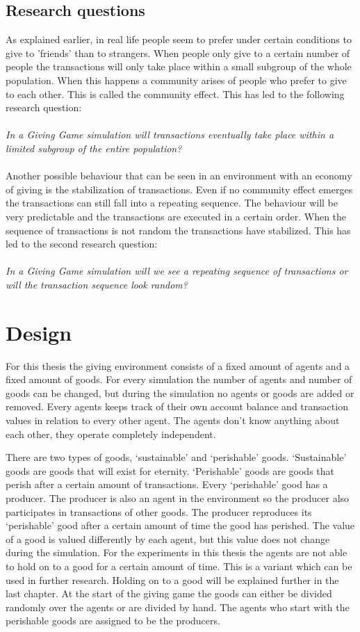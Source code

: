 \documentclass[twoside,openright]{uva-bachelor-thesis}
\begin{document}
\section{Research questions}
As explained earlier, in real life people seem to prefer under certain conditions to give to 'friends' than to strangers. When people only give to a certain number of people the transactions will only take place within a small subgroup of the whole population. When this happens a community arises of people who prefer to give to each other. This is called the community effect. This has led to the following research question:
\\
\\
\textit{In a Giving Game simulation will transactions eventually take place within a limited subgroup of the entire population?}
\\
\\
Another possible behaviour that can be seen in an environment with an economy of giving is the stabilization of transactions. Even if no community effect emerges the transactions can still fall into a repeating sequence. The behaviour will be very predictable and the transactions are executed in a certain order. When the sequence of transactions is not random the transactions have stabilized. This has led to the second research question:
\\
\\
\textit{In a Giving Game simulation will we see a repeating sequence of transactions or will the transaction sequence look random?}


\chapter{Design}
For this thesis the giving environment consists of a fixed amount of agents and a fixed amount of goods. For every simulation the number of agents and number of goods can be changed, but during the simulation no agents or goods are added or removed.  Every agents keeps track of their own account balance and transaction values in relation to every other agent. The agents don’t know anything about each other, they operate completely independent.

There are two types of goods, ‘sustainable’ and ‘perishable’ goods. ‘Sustainable’ goods are goods that will exist for eternity. ‘Perishable’ goods are goods that perish after a certain amount of transactions. Every ‘perishable’ good has a producer. The producer is also an agent in the environment so the producer also participates in transactions of other goods. The producer reproduces its ‘perishable’ good after a certain amount of time the good has perished. The value of a good is valued differently by each agent, but this value does not change during the simulation. For the experiments in this thesis the agents are not able to hold on to a good for a certain amount of time. This is a variant which can be used in further research. Holding on to a good will be explained further in the last chapter. At the start of the giving game the goods can either be divided randomly over the agents or are divided by hand. The agents who start with the perishable goods are assigned to be the producers.
\end{document}
